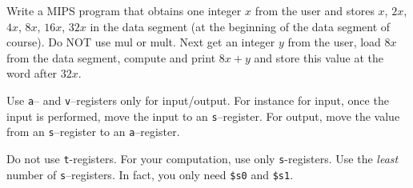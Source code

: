 

\renewcommand\AUTHOR{aoro1@cougars.ccis.edu} %


\topmattertwo

\nextq
Write a MIPS program that 
obtains one integer $x$ from the user 
and stores $x$, $2x$, $4x$, $8x$, $16x$, $32x$ in the data segment
(at the beginning of the data segment of course).
Do NOT use mul or mult.
Next get an integer $y$ from the user, 
load $8x$ from the data segment,
compute and print $8x + y$ and store this value at the word after $32x$.

Use \verb!a!-- and \verb!v!--registers only for input/output. 
For instance for input, once the input is performed, move
the input to an \verb!s!--register.
For output, move the value from an \verb!s!--register to an \verb$a$--register.

Do not use \verb!t!-registers. 
For your computation, use only \verb!s!-registers. 
Use the \textit{least} number of \verb!s!--registers.
In fact, you only need \verb!$s0! and \verb!$s1!.

